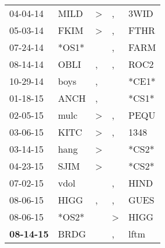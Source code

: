 \begin{supertabular}{p{0.07\textwidth}p{0.06\textwidth}p{0.02\textwidth}p{0.02\textwidth}p{0.06\textwidth}}
          04-04-14\textsuperscript{} &           MILD\textsuperscript{} &     \textgreater &                , &           3WID\textsuperscript{} \\
          05-03-14\textsuperscript{} &           FKIM\textsuperscript{} &     \textgreater &                , &           FTHR\textsuperscript{} \\
          07-24-14\textsuperscript{} &                            *OS1* &                  &                , &           FARM\textsuperscript{} \\
          08-14-14\textsuperscript{} &           OBLI\textsuperscript{} &                , &                , &           ROC2\textsuperscript{} \\
          10-29-14\textsuperscript{} &           boys\textsuperscript{} &                , &                  &                            *CE1* \\
          01-18-15\textsuperscript{} &           ANCH\textsuperscript{} &                , &                  &                            *CS1* \\
          02-05-15\textsuperscript{} &           mulc\textsuperscript{} &     \textgreater &                , &           PEQU\textsuperscript{} \\
          03-06-15\textsuperscript{} &           KITC\textsuperscript{} &     \textgreater &                , &           1348\textsuperscript{} \\
          03-14-15\textsuperscript{} &           hang\textsuperscript{} &     \textgreater &                  &                            *CS2* \\
          04-23-15\textsuperscript{} &           SJIM\textsuperscript{} &     \textgreater &                  &                            *CS2* \\
          07-02-15\textsuperscript{} &           vdol\textsuperscript{} &                  &                , &           HIND\textsuperscript{} \\
          08-06-15\textsuperscript{} &           HIGG\textsuperscript{} &                , &                , &           GUES\textsuperscript{} \\
          08-06-15\textsuperscript{} &                            *OS2* &                  &     \textgreater &           HIGG\textsuperscript{} \\
 \textbf{08-14-15\textsuperscript{}} &           BRDG\textsuperscript{} &                  &                , &           lftm\textsuperscript{} \\

\end{supertabular}
